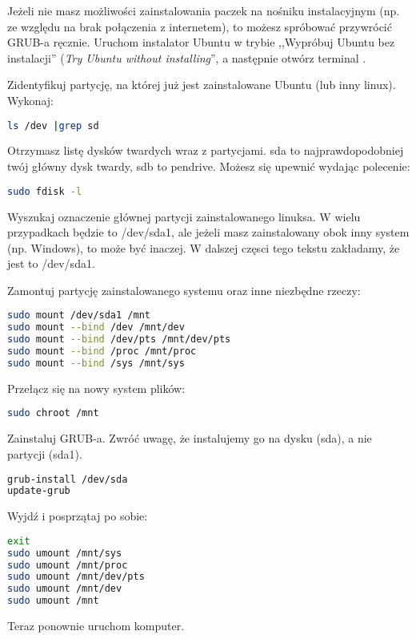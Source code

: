Jeżeli nie masz możliwości zainstalowania paczek na nośniku instalacyjnym (np. ze względu na brak połączenia z internetem), to możesz spróbować przywrócić GRUB-a ręcznie. Uruchom instalator Ubuntu w trybie ,,Wypróbuj Ubuntu bez instalacji'' (\textit{Try Ubuntu without installing}'', a następnie otwórz terminal .

Zidentyfikuj partycję, na której już jest zainstalowane Ubuntu (lub inny linux). Wykonaj:

\begin{lstlisting}[language=bash]
ls /dev |grep sd
\end{lstlisting}

Otrzymasz listę dysków twardych wraz z partycjami. \textcolor{ubuntu_orange}{sda} to najprawdopodobniej twój główny dysk twardy, sdb to pendrive. Możesz się upewnić wydając polecenie:

\begin{lstlisting}[language=bash]
sudo fdisk -l
\end{lstlisting}

Wyszukaj oznaczenie głównej partycji zainstalowanego linuksa. W wielu przypadkach będzie to /dev/sda1, ale jeżeli masz zainstalowany obok inny system (np. Windows), to może być inaczej. W dalszej częsci tego tekstu zakładamy, że jest to /dev/sda1.

Zamontuj partycję zainstalowanego systemu oraz inne niezbędne rzeczy:
\begin{lstlisting}[language=bash]
sudo mount /dev/sda1 /mnt
sudo mount --bind /dev /mnt/dev
sudo mount --bind /dev/pts /mnt/dev/pts
sudo mount --bind /proc /mnt/proc
sudo mount --bind /sys /mnt/sys
\end{lstlisting}

Przełącz się na nowy system plików:

\begin{lstlisting}[language=bash]
sudo chroot /mnt
\end{lstlisting}

Zainstaluj GRUB-a. Zwróć uwagę, że instalujemy go na dysku (sda), a nie partycji (sda1).

\begin{lstlisting}[language=bash]
grub-install /dev/sda
update-grub
\end{lstlisting}

Wyjdź i posprzątaj po sobie:

\begin{lstlisting}[language=bash]
exit
sudo umount /mnt/sys
sudo umount /mnt/proc
sudo umount /mnt/dev/pts
sudo umount /mnt/dev
sudo umount /mnt
\end{lstlisting}

Teraz ponownie uruchom komputer.
\clearpage
